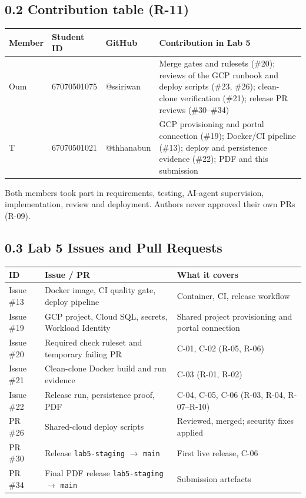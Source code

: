 \documentclass[11pt,a4paper]{article}
\begin{document}
\subsection*{0.2 Contribution table (R-11)}
\begin{longtable}{@{}L{1.8cm}L{3.5cm}L{2.6cm}L{8.3cm}@{}}
\toprule
\textbf{Member} & \textbf{Student ID} & \textbf{GitHub} & \textbf{Contribution in Lab 5} \\
\midrule
Oum & 67070501075 & @ssiriwan & Merge gates and rulesets (\#20); reviews of the GCP runbook and deploy scripts (\#23, \#26); clean-clone verification (\#21); release PR reviews (\#30--\#34) \\
T & 67070501021 & @thhanabun & GCP provisioning and portal connection (\#19); Docker/CI pipeline (\#13); deploy and persistence evidence (\#22); PDF and this submission \\
\bottomrule
\end{longtable}
Both members took part in requirements, testing, AI-agent supervision, implementation,
review and deployment. Authors never approved their own PRs (R-09).

\subsection*{0.3 Lab 5 Issues and Pull Requests}
\begin{longtable}{@{}L{1.4cm}L{7.6cm}L{7.2cm}@{}}
\toprule
\textbf{ID} & \textbf{Issue / PR} & \textbf{What it covers} \\
\midrule
Issue \#13 & Docker image, CI quality gate, deploy pipeline & Container, CI, release workflow \\
Issue \#19 & GCP project, Cloud SQL, secrets, Workload Identity & Shared project provisioning and portal connection \\
Issue \#20 & Required check ruleset and temporary failing PR & C-01, C-02 (R-05, R-06) \\
Issue \#21 & Clean-clone Docker build and run evidence & C-03 (R-01, R-02) \\
Issue \#22 & Release run, persistence proof, PDF & C-04, C-05, C-06 (R-03, R-04, R-07--R-10) \\
PR \#26 & Shared-cloud deploy scripts & Reviewed, merged; security fixes applied \\
PR \#30 & Release \texttt{lab5-staging} $\to$ \texttt{main} & First live release, C-06 \\
PR \#34 & Final PDF release \texttt{lab5-staging} $\to$ \texttt{main} & Submission artefacts \\
\bottomrule
\end{longtable}
\end{document}
